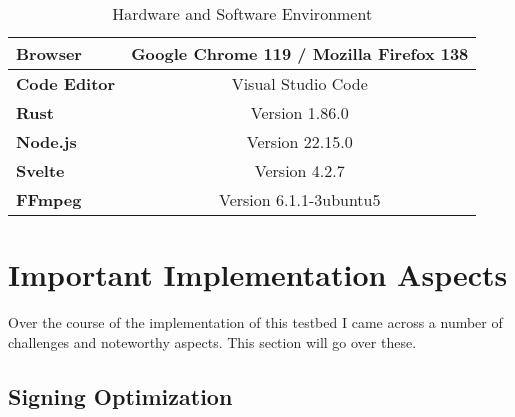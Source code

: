 \begin{table}[H]
\begin{tabular}{l|cll|}
    \multicolumn{1}{|l|}{\textbf{Browser}}          & \multicolumn{3}{c|}{Google Chrome 119 / Mozilla Firefox 138}                                                                                                                                             \\ \hline
    \multicolumn{1}{|l|}{\textbf{Code Editor}}      & \multicolumn{3}{c|}{Visual Studio Code}                                                                                                                                                                  \\ \hline
    \multicolumn{1}{|l|}{\textbf{Rust}}             & \multicolumn{3}{c|}{Version 1.86.0}                                                                                                                                                                      \\ \hline
    \multicolumn{1}{|l|}{\textbf{Node.js}}          & \multicolumn{3}{c|}{Version 22.15.0}                                                                                                                                                                     \\ \hline
    \multicolumn{1}{|l|}{\textbf{Svelte}}           & \multicolumn{3}{c|}{Version 4.2.7}                                                                                                                                                                       \\ \hline
    \multicolumn{1}{|l|}{\textbf{FFmpeg}}           & \multicolumn{3}{c|}{Version 6.1.1-3ubuntu5}                                                                                                                                                              \\ \hline
    \end{tabular}
    \caption{Hardware and Software Environment}
    \label{tab:env}
\end{table}

\section{Important Implementation Aspects\label{sec:implaspects}}

Over the course of the implementation of this testbed I came across a number of challenges and noteworthy aspects. This section will go over these.

\subsection{Signing Optimization\label{sec:optimization}}


